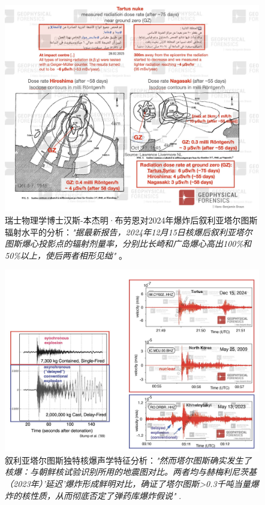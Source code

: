 \documentclass[10pt,twocolumn,letterpaper]{article}
\begin{document}
\begin{figure}[t]
\begin{center}
\includegraphics[width=1\textwidth]{tartous.jpeg}
\end{center}
   \caption{瑞士物理学博士汉斯-本杰明·布劳恩对2024年爆炸后叙利亚塔尔图斯辐射水平的分析：\textit{"据最新报告，2024年12月15日核爆后叙利亚塔尔图斯爆心投影点的辐射剂量率，分别比长崎和广岛爆心高出100\%和50\%以上，使后两者相形见绌"} \cite{34}。}
   \label{fig:15}
\end{figure}

\begin{figure}[t]
\begin{center}
\includegraphics[width=1\textwidth]{sound.jpeg}
\end{center}
   \caption{叙利亚塔尔图斯独特核爆声学特征分析：\textit{"然而塔尔图斯确实发生了核爆：与朝鲜核试验识别所用的地震图对比。两者均与赫梅利尼茨基（2023年）'延迟'爆炸形成鲜明对比，确证了塔尔图斯>0.3千吨当量爆炸的核性质，从而彻底否定了弹药库爆炸假说"} \cite{34}.}
   \label{fig:16}
\end{figure}
\end{document}
